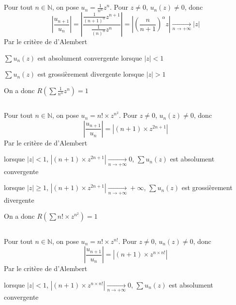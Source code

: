 \documentclass[a4paper,12pt]{book}
\begin{document}
\renewcommand{\labelitemi}{$\blacktriangleright$}
\renewcommand{\labelitemii}{$\bullet$}


\section{}
\subsection{}
Pour tout $n \in \mathbb{N}$, on pose $u_n=\frac{1}{n^\alpha}z^n$. Pour $z \neq 0$, $u_n(z) \neq 0$, donc 
$$
\left|\frac{u_{n+1}}{u_n}\right|=\left|\frac{\frac{1}{(n+1)^\alpha}z^{n+1}}{\frac{1}{(n)^\alpha}z^{n}}\right|=\left|(\frac{n}{n+1})^\alpha z\right|\xrightarrow[n \to +\infty]{}|z|
$$
Par le critère de d'Alembert

$\sum u_n(z)$ est absolument convergente lorsque $|z|<1$

$\sum u_n(z)$ est grossièrement divergente lorsque $|z|>1$

On a donc $\boxed{R(\sum \frac{1}{n^\alpha}z^n)=1}$

\subsection{}
Pour tout $n \in \mathbb{N}$, on pose $u_n=n!\times z^{n^2}$. Pour $z \neq 0$, $u_n(z) \neq 0$, donc 
$$
\left|\frac{u_{n+1}}{u_n}\right|=\left|(n+1)\times z^{2n+1}\right|%
$$
Par le critère de d'Alembert

lorsque $|z|<1$, $\left|(n+1)\times z^{2n+1}\right|\xrightarrow[n \to +\infty]{}0$, $\sum u_n(z)$ est absolument convergente

lorsque $|z|\geq 1$, $\left|(n+1)\times z^{2n+1}\right|\xrightarrow[n \to +\infty]{}+\infty$, $\sum u_n(z)$ est grossièrement divergente

On a donc $\boxed{R(\sum n!\times z^{n^2})=1}$

\subsection{}
Pour tout $n \in \mathbb{N}$, on pose $u_n=n!\times z^{n!}$. Pour $z \neq 0$, $u_n(z) \neq 0$, donc 
$$
\left|\frac{u_{n+1}}{u_n}\right|=\left|(n+1)\times z^{n \times n!}\right|%
$$
Par le critère de d'Alembert

lorsque $|z|<1$, $\left|(n+1)\times z^{n \times n!}\right|\xrightarrow[n \to +\infty]{}0$, $\sum u_n(z)$ est absolument convergente
\end{document}
